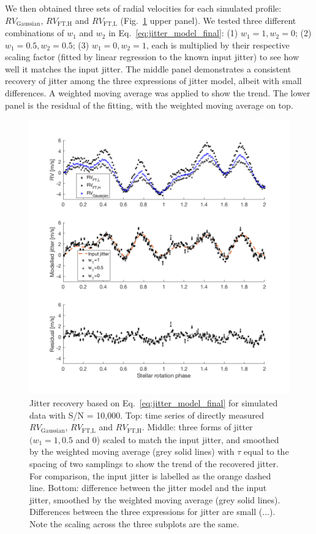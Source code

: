 We then obtained three sets of radial velocities for each simulated profile: $RV_\text{Gaussian}$, $RV_\text{FT,H}$ and $RV_\text{FT,L}$ (Fig.~\ref{fig:PLANET_AND_JITTER} upper panel). We tested three different combinations of $w_1$ and $w_2$ in Eq.~\ref{eq:jitter_model_final}: (1) $w_1=1, w_2=0$; (2) $w_1=0.5, w_2=0.5$; (3) $w_1=0, w_2=1$, each is multiplied by their respective scaling factor (fitted by linear regression to the known input jitter) to see how well it matches the input jitter. The middle panel demonstrates a consistent recovery of jitter among the three expressions of jitter model, albeit with small differences. A weighted moving average was applied to show the trend. The lower panel is the residual of the fitting, with the weighted moving average on top. 

\begin{figure}[tbp]
\centering
\includegraphics[width = 0.99 \linewidth]
{./Figures/Methods/5-PLANET_AND_JITTER2.png}
\caption[Jitter model]
{Jitter recovery based on Eq.~\ref{eq:jitter_model_final} for simulated data with S/N = 10,000. Top: time series of directly measured $RV_\text{Gaussian}$, $RV_\text{FT,L}$ and $RV_\text{FT,H}$. Middle: three forms of jitter $(w_1 = 1, 0.5$ and 0) scaled to match the input jitter, and smoothed by the weighted moving average (grey solid lines) with $\tau$ equal to the spacing of two samplings to show the trend of the recovered jitter. For comparison, the input jitter is labelled as the orange dashed line. Bottom: difference between the jitter model and the input jitter, smoothed by the weighted moving average (grey solid lines). Differences between the three expressions for jitter are small (...). Note the scaling across the three subplots are the same.}
\label{fig:PLANET_AND_JITTER}
\end{figure} 

